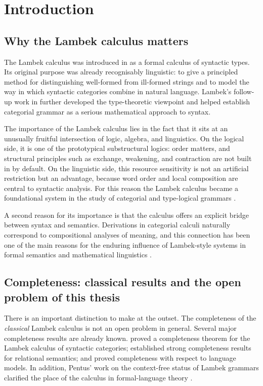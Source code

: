 \documentclass[12pt,a4paper]{report}
\theoremstyle{definition}
\begin{document}
\tableofcontents
\clearpage
{}

\chapter{Introduction}

\section{Why the Lambek calculus matters}
The Lambek calculus was introduced in \citet{Lambek1958} as a formal calculus of syntactic
types. Its original purpose was already recognisably linguistic: to give a principled method for
distinguishing well-formed from ill-formed strings and to model the way in which syntactic
categories combine in natural language. Lambek's follow-up work in \citet{Lambek1961}
further developed the type-theoretic viewpoint and helped establish categorial grammar as a
serious mathematical approach to syntax.

The importance of the Lambek calculus lies in the fact that it sits at an unusually fruitful
intersection of logic, algebra, and linguistics. On the logical side, it is one of the prototypical
substructural logics: order matters, and structural principles such as exchange, weakening, and
contraction are not built in by default. On the linguistic side, this resource sensitivity is not an
artificial restriction but an advantage, because word order and local composition are central to
syntactic analysis. For this reason the Lambek calculus became a foundational system in the
study of categorial and type-logical grammars \citep{vanBenthem1988,Moortgat1995Multimodal,morrill1996generalising}.

A second reason for its importance is that the calculus offers an explicit bridge between syntax
and semantics. Derivations in categorial calculi naturally correspond to compositional analyses of
meaning, and this connection has been one of the main reasons for the enduring influence of
Lambek-style systems in formal semantics and mathematical linguistics \citep{vanBenthem1988,Steedman2000}.

\section{Completeness: classical results and the open problem of this thesis}
There is an important distinction to make at the outset. The completeness of the \emph{classical}
Lambek calculus is not an open problem in general. Several major completeness results are
already known. \citet{Dosen1985} proved a completeness theorem for the Lambek calculus of
syntactic categories; \citet{AndrekaMikulas1994} established strong completeness results for
relational semantics; and \citet{Pentus1995} proved completeness with respect to language
models. In addition, Pentus' work on the context-free status of Lambek grammars clarified the
place of the calculus in formal-language theory \citep{Pentus1993,Pentus1997}.
\end{document}
